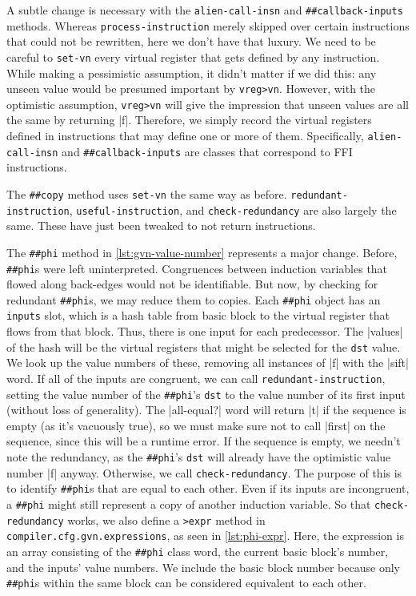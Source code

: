 A subtle change is necessary with the \Verb|alien-call-insn| and
\Verb|##callback-inputs| methods.  Whereas \Verb|process-instruction|
merely skipped over certain instructions that could not be rewritten, here we
don't have that luxury.  We need to be careful to \Verb|set-vn| every virtual
register that gets defined by any instruction.  While making a pessimistic
assumption, it didn't matter if we did this: any unseen value would be presumed
important by \Verb|vreg>vn|.  However, with the optimistic assumption,
\Verb|vreg>vn| will give the impression that unseen values are all the same
by returning \factor|f|.  Therefore, we simply record the virtual registers
defined in instructions that may define one or more of them.  Specifically,
\Verb|alien-call-insn| and \Verb|##callback-inputs| are classes that
correspond to \gls{FFI} instructions.

The \Verb|##copy| method uses \Verb|set-vn| the same way as before.
\Verb|redundant-instruction|, \Verb|useful-instruction|, and
\Verb|check-redundancy| are also largely the same.  These have just been
tweaked to not return instructions.


The \Verb|##phi| method in \cref{lst:gvn-value-number} represents a major
change. Before, \Verb|##phi|s were left uninterpreted.  Congruences between
induction variables that flowed along back-edges would not be identifiable.
But now, by checking for redundant \Verb|##phi|s, we may reduce them to
copies.  Each \Verb|##phi| object has an \Verb|inputs| slot, which is a
hash table from basic block to the virtual register that flows from that block.
Thus, there is one input for each predecessor.  The \factor|values| of the hash
will be the virtual registers that might be selected for the \Verb|dst|
value.  We look up the value numbers of these, removing all instances of
\factor|f| with the \factor|sift| word.  If all of the inputs are congruent, we
can call \Verb|redundant-instruction|, setting the value number of the
\Verb|##phi|'s \Verb|dst| to the value number of its first input (without
loss of generality).  The \factor|all-equal?| word will return \factor|t| if
the sequence is empty (as it's vacuously true), so we must make sure not to
call \factor|first| on the sequence, since this will be a runtime error.  If
the sequence is empty, we needn't note the redundancy, as the \Verb|##phi|'s
\Verb|dst| will already have the optimistic value number \factor|f| anyway.
Otherwise, we call \Verb|check-redundancy|.  The purpose of this is to
identify \Verb|##phi|s that are equal to each other.  Even if its inputs are
incongruent, a \Verb|##phi| might still represent a copy of another induction
variable.  So that \Verb|check-redundancy| works, we also define a
\Verb|>expr| method in \Verb|compiler.cfg.gvn.expressions|, as seen in
\cref{lst:phi-expr}.  Here, the expression is an array consisting of the
\Verb|##phi| class word, the current basic block's number, and the inputs'
value numbers.  We include the basic block number because only \Verb|##phi|s
within the same block can be considered equivalent to each other.

